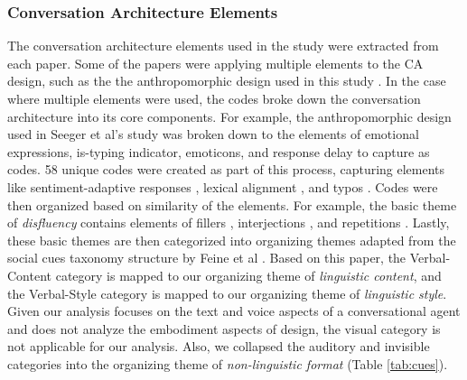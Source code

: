 \documentclass[sigconf,screen,review, anonymous]{acmart}
\newcommand{\cmt}[1]{}%
\begin{document}
\subsubsection*{Conversation Architecture Elements}
The conversation architecture elements used in the study were extracted from each paper. Some of the papers were applying multiple elements to the CA design, such as the the anthropomorphic design used in this study \cite{seeger2021chatbots}\cmt{[35]}. In the case where multiple elements were used, the codes broke down the conversation architecture into its core components. For example, the anthropomorphic design used in Seeger et al's study \cite{seeger2021chatbots}\cmt{[35]} was broken down to the elements of emotional expressions, is-typing indicator, emoticons, and response delay to capture as codes. 58 unique codes were created as part of this process, capturing elements like sentiment-adaptive responses \cite{diederich2019emulating}\cmt{[25]}, lexical alignment \cite{spillner2021talk}\cmt{[18]}, and typos \cite{westerman2019believe}\cmt{[9]}. Codes were then organized based on similarity of the elements. For example, the basic theme of \textit{disfluency} contains elements of fillers \cite{jeong2019exploring}\cmt{[10]}\cite{wester2015artificial}\cmt{[14]}, interjections \cite{ceha2022expressive}\cmt{[77]}\cite{hu2021enhancing}\cmt{[56]}, and repetitions \cite{yang2021effect}\cmt{[72]}. Lastly, these basic themes are then categorized into organizing themes adapted from the social cues taxonomy structure by Feine et al \cite{feine2019taxonomy}. Based on this paper, the Verbal-Content category is mapped to our organizing theme of \textit{linguistic content}, and the Verbal-Style category is mapped to our organizing theme of \textit{linguistic style}.
Given our analysis focuses on the text and voice aspects of a conversational agent and does not analyze the embodiment aspects of design, the visual category is not applicable for our analysis. Also, we collapsed the auditory and invisible categories into the organizing theme of \textit{non-linguistic format} (Table \ref{tab:cues}).
\end{document}
